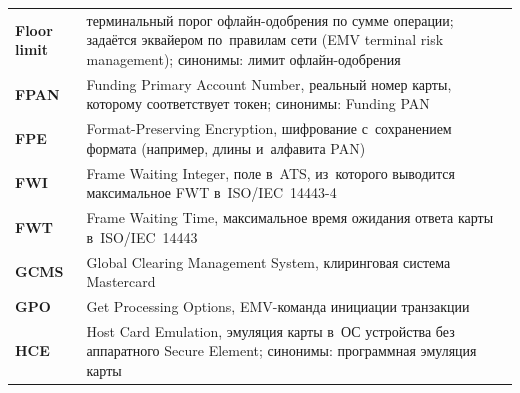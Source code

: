 \begin{longtable}{@{}p{4.5em}p{\dimexpr\linewidth-4.5em-2\tabcolsep\relax}@{}}
  \textbf{Floor limit}       & терминальный порог офлайн-одобрения по сумме операции; задаётся эквайером по~правилам сети (EMV terminal risk management); синонимы: лимит офлайн-одобрения                                                                                                                                  \\
  \textbf{FPAN}              & Funding Primary Account Number, реальный номер карты, которому соответствует токен; синонимы: Funding PAN                                                                                                                                                                                                  \\
  \textbf{FPE}               & Format-Preserving Encryption, шифрование с~сохранением формата (например, длины и~алфавита PAN)                                                                                                                                                                                                  \\
  \textbf{FWI}               & Frame Waiting Integer, поле в~ATS, из~которого выводится максимальное FWT в~ISO/IEC~14443-4                                                                                                                                                                                                     \\
  \textbf{FWT}               & Frame Waiting Time, максимальное время ожидания ответа карты в~ISO/IEC~14443                                                                                                                                                                                                                     \\
  \textbf{GCMS}              & Global Clearing Management System, клиринговая система Mastercard                                                                                                                                                                                                                                \\
  \textbf{GPO}               & Get Processing Options, EMV-команда инициации транзакции                                                                                                                                                                                                                                         \\
  \textbf{HCE}               & Host Card Emulation, эмуляция карты в~ОС устройства без аппаратного Secure Element; синонимы: программная эмуляция карты                                                                                                                                                                         \\

\end{longtable}
